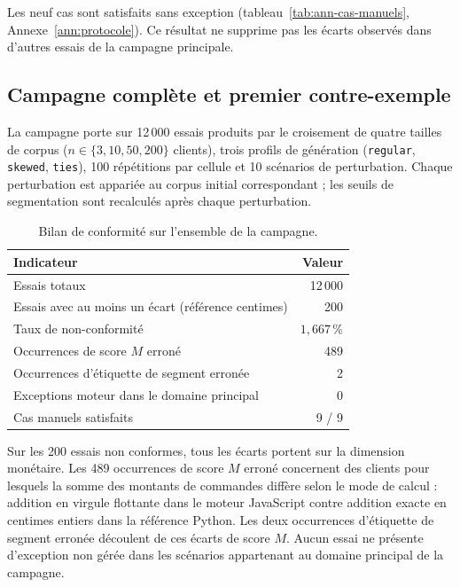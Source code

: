 Les neuf cas sont satisfaits sans exception (tableau~\ref{tab:ann-cas-manuels},
Annexe~\ref{ann:protocole}). Ce résultat ne supprime pas les écarts observés dans d'autres
essais de la campagne principale.

\subsection{Campagne complète et premier contre-exemple}
\label{subsec:resultats-campagne}

La campagne porte sur 12\,000 essais produits par le croisement de quatre tailles de corpus
($n \in \{3, 10, 50, 200\}$ clients), trois profils de génération (\texttt{regular},
\texttt{skewed}, \texttt{ties}), 100 répétitions par cellule et 10 scénarios de perturbation.
Chaque perturbation est appariée au corpus initial correspondant ; les seuils de segmentation
sont recalculés après chaque perturbation.

\begin{table}[htb]
  \centering
  \caption{Bilan de conformité sur l'ensemble de la campagne.}
  \label{tab:resultats-conformite-bilan}
  \begin{tabular}{lr}
    \toprule
    Indicateur & Valeur \\
    \midrule
    Essais totaux                                       & 12\,000 \\
    Essais avec au moins un écart (référence centimes)  & 200 \\
    Taux de non-conformité                              & $1{,}667\,\%$ \\
    Occurrences de score $M$ erroné                     & 489 \\
    Occurrences d'étiquette de segment erronée          & 2 \\
    Exceptions moteur dans le domaine principal         & 0 \\
    Cas manuels satisfaits                              & 9 / 9 \\
    \bottomrule
  \end{tabular}
\end{table}

Sur les 200 essais non conformes, tous les écarts portent sur la dimension monétaire.
Les 489 occurrences de score $M$ erroné concernent des clients pour lesquels la somme des
montants de commandes diffère selon le mode de calcul : addition en virgule flottante dans
le moteur JavaScript contre addition exacte en centimes entiers dans la référence Python.
Les deux occurrences d'étiquette de segment erronée découlent de ces écarts de score $M$.
Aucun essai ne présente d'exception non gérée dans les scénarios appartenant au domaine
principal de la campagne.


